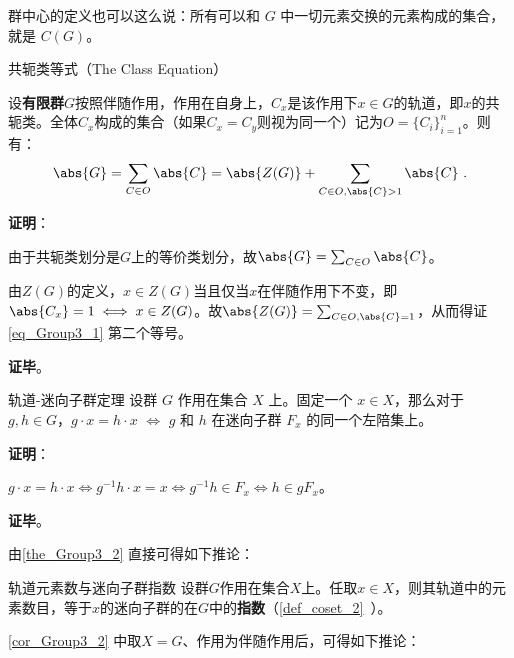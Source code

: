 群中心的定义也可以这么说：所有可以和 $G$ 中一切元素交换的元素构成的集合，就是 $C(G)$。








\begin{theorem}{共轭类等式（The Class Equation）}\label{the_Group3_4}

设\textbf{有限群}$G$按照伴随作用，作用在自身上，$C_x$是该作用下$x\in G$的轨道，即$x$的共轭类。全体$C_x$构成的集合（如果$C_x=C_y$则视为同一个）记为$O=\{C_i\}_{i=1}^n$。则有：
\begin{equation}\label{eq_Group3_1}
\abs{G} = \sum_{C\in O} \abs{C} = \abs{Z(G)} + \sum_{C\in O, \abs{C}>1} \abs{C}~.
\end{equation}

\end{theorem}


\textbf{证明}：

由于共轭类划分是$G$上的等价类划分，故$\abs{G} = \sum_{C\in O} \abs{C}$。

由$Z(G)$的定义，$x\in Z(G)$当且仅当$x$在伴随作用下不变，即$\abs{C_x}=1\iff x\in Z(G)$。故$\abs{Z(G)}=\sum_{C\in O, \abs{C}=1}$，从而得证\autoref{eq_Group3_1} 第二个等号。

\textbf{证毕}。




\begin{theorem}{轨道-迷向子群定理}\label{the_Group3_2}
设群 $G$ 作用在集合 $X$ 上。固定一个 $x\in X$，那么对于 $g, h\in G$，$g\cdot x= h\cdot x$ $\iff$ $g$ 和 $h$ 在迷向子群 $F_x$ 的同一个左陪集上。
\end{theorem}

\textbf{证明}：

 $g\cdot x=h\cdot x\iff g^{-1}h\cdot x=x\iff g^{-1}h\in F_x\iff h\in gF_x$。

\textbf{证毕}。






由\autoref{the_Group3_2} 直接可得如下推论：


\begin{corollary}{轨道元素数与迷向子群指数}\label{cor_Group3_2}
设群$G$作用在集合$X$上。任取$x\in X$，则其轨道中的元素数目，等于$x$的迷向子群的在$G$中的\textbf{指数}（\autoref{def_coset_2}~）。
\end{corollary}




\autoref{cor_Group3_2} 中取$X=G$、作用为伴随作用后，可得如下推论：

